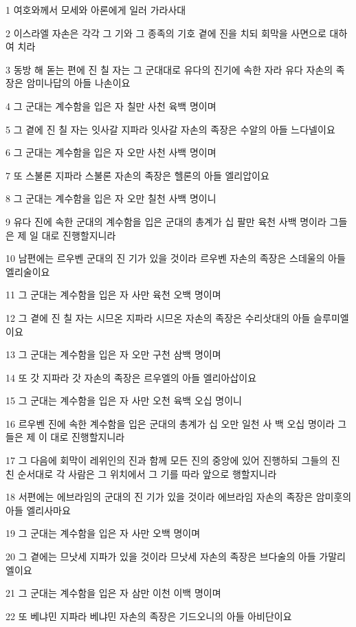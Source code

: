 \par 1 여호와께서 모세와 아론에게 일러 가라사대
\par 2 이스라엘 자손은 각각 그 기와 그 종족의 기호 곁에 진을 치되 회막을 사면으로 대하여 치라
\par 3 동방 해 돋는 편에 진 칠 자는 그 군대대로 유다의 진기에 속한 자라 유다 자손의 족장은 암미나답의 아들 나손이요
\par 4 그 군대는 계수함을 입은 자 칠만 사천 육백 명이며
\par 5 그 곁에 진 칠 자는 잇사갈 지파라 잇사갈 자손의 족장은 수알의 아들 느다넬이요
\par 6 그 군대는 계수함을 입은 자 오만 사천 사백 명이며
\par 7 또 스불론 지파라 스불론 자손의 족장은 헬론의 아들 엘리압이요
\par 8 그 군대는 계수함을 입은 자 오만 칠천 사백 명이니
\par 9 유다 진에 속한 군대의 계수함을 입은 군대의 총계가 십 팔만 육천 사백 명이라 그들은 제 일 대로 진행할지니라
\par 10 남편에는 르우벤 군대의 진 기가 있을 것이라 르우벤 자손의 족장은 스데울의 아들 엘리술이요
\par 11 그 군대는 계수함을 입은 자 사만 육천 오백 명이며
\par 12 그 곁에 진 칠 자는 시므온 지파라 시므온 자손의 족장은 수리삿대의 아들 슬루미엘이요
\par 13 그 군대는 계수함을 입은 자 오만 구천 삼백 명이며
\par 14 또 갓 지파라 갓 자손의 족장은 르우엘의 아들 엘리아삽이요
\par 15 그 군대는 계수함을 입은 자 사만 오천 육백 오십 명이니
\par 16 르우벤 진에 속한 계수함을 입은 군대의 총계가 십 오만 일천 사 백 오십 명이라 그들은 제 이 대로 진행할지니라
\par 17 그 다음에 회막이 레위인의 진과 함께 모든 진의 중앙에 있어 진행하되 그들의 진 친 순서대로 각 사람은 그 위치에서 그 기를 따라 앞으로 행할지니라
\par 18 서편에는 에브라임의 군대의 진 기가 있을 것이라 에브라임 자손의 족장은 암미훗의 아들 엘리사마요
\par 19 그 군대는 계수함을 입은 자 사만 오백 명이며
\par 20 그 곁에는 므낫세 지파가 있을 것이라 므낫세 자손의 족장은 브다술의 아들 가말리엘이요
\par 21 그 군대는 계수함을 입은 자 삼만 이천 이백 명이며
\par 22 또 베냐민 지파라 베냐민 자손의 족장은 기드오니의 아들 아비단이요
